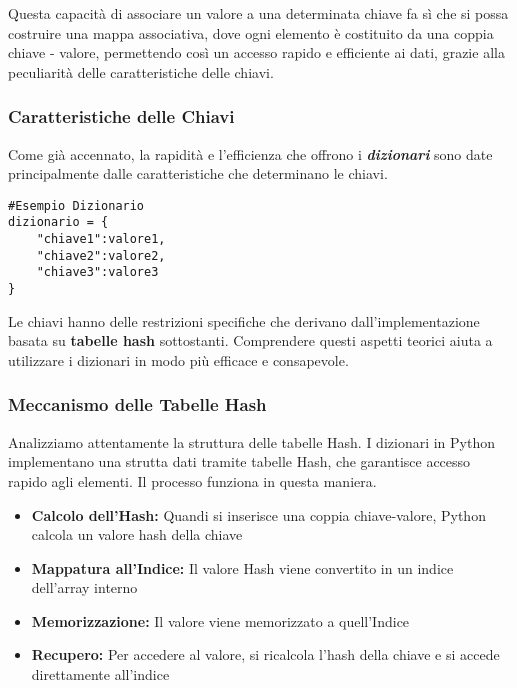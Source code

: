 Questa capacità di associare un valore a una determinata chiave fa sì che si possa costruire una mappa associativa, dove ogni elemento è costituito da una coppia chiave - valore, permettendo così un accesso rapido e efficiente ai dati, grazie alla peculiarità delle caratteristiche delle chiavi.

\subsubsection{Caratteristiche delle Chiavi}\label{CaratteristicheChiaviDict}
Come già accennato, la rapidità e l'efficienza che offrono i \textit{\textbf{dizionari}} sono date principalmente dalle caratteristiche che determinano le chiavi.


\begin{lstlisting}
#Esempio Dizionario
dizionario = {
    "chiave1":valore1,
    "chiave2":valore2,
    "chiave3":valore3
}
\end{lstlisting}
\vspace{0.5cm}

Le chiavi hanno delle restrizioni specifiche che derivano dall'implementazione basata su \textbf{tabelle hash} sottostanti.
Comprendere questi aspetti teorici aiuta a utilizzare i dizionari in modo più efficace e consapevole.


\subsubsection{Meccanismo delle Tabelle Hash}\label{MeccanismoTabellaHashDict}
Analizziamo attentamente la struttura delle tabelle Hash.
I dizionari in Python implementano una strutta dati tramite tabelle Hash, che garantisce accesso rapido agli elementi. Il processo funziona in questa maniera.
\vspace{0.3cm}

\begin{itemize}
    \item \textbf{Calcolo dell'Hash:} Quandi si inserisce una coppia chiave-valore, Python calcola un valore hash della chiave
    \item \textbf{Mappatura all'Indice:} Il valore Hash viene convertito in un indice dell'array interno
    \item \textbf{Memorizzazione:} Il valore viene memorizzato a quell'Indice
    \item \textbf{Recupero:} Per accedere al valore, si ricalcola l'hash della chiave e si accede direttamente all'indice
\end{itemize}
\vspace{0.5cm}

